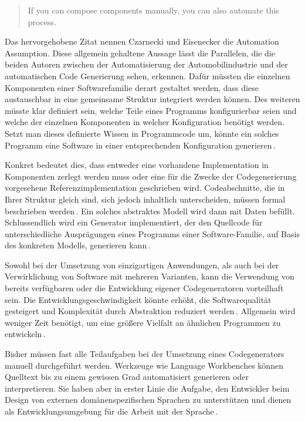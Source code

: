 \documentclass[12pt,oneside,a4paper,parskip]{scrbook}
\begin{document}
\begin{quote}
	\glqq If you can compose components manually, you can also automate this process.\grqq
\end{quote}

Das hervorgehobene Zitat nennen Czarnecki und Eisenecker die Automation Assumption. Diese allgemein gehaltene Aussage lässt die Parallelen, die die beiden Autoren zwischen der Automatisierung der Automobilindustrie und der automatischen Code Generierung sehen, erkennen. Dafür müssten die einzelnen Komponenten einer Softwarefamilie derart gestaltet werden, dass diese austauschbar in eine gemeinsame Struktur integriert werden können. Des weiteren müsste klar definiert sein, welche Teile eines Programms konfigurierbar seien und welche der einzelnen Komponenten in welcher Konfiguration benötigt werden. Setzt man dieses definierte Wissen in Programmcode um, könnte ein solches Programm eine Software in einer entsprechenden Konfiguration generieren\,\cite{czaeis2000}.

Konkret bedeutet dies, dass entweder eine vorhandene Implementation in Komponenten zerlegt werden muss oder eine für die Zwecke der Codegenerierung vorgesehene Referenzimplementation geschrieben wird. Codeabschnitte, die in Ihrer Struktur gleich sind, sich jedoch inhaltlich unterscheiden, müssen formal beschrieben werden\,\cite{stahl2007}. Ein solches abstraktes Modell wird dann mit Daten befüllt. Schlussendlich wird ein Generator implementiert, der den Quellcode für unterschiedliche Ausprägungen eines Programms einer Software-Familie, auf Basis des konkreten Modells, generieren kann\,\cite{fowler2010}.

Sowohl bei der Umsetzung von einzigartigen Anwendungen, als auch bei der Verwirklichung von Software mit mehreren Varianten, kann die Verwendung von bereits verfügbaren oder die Entwicklung eigener Codegeneratoren vorteilhaft sein. Die Entwicklungsgeschwindigkeit könnte erhöht, die Softwarequalität gesteigert und Komplexität durch Abstraktion reduziert werden\,\cite{stahl2007}. Allgemein wird weniger Zeit benötigt, um eine größere Vielfalt an ähnlichen Programmen zu entwickeln\,\cite{czaeis2000}.

Bisher müssen fast alle Teilaufgaben bei der Umsetzung eines Codegenerators manuell durchgeführt werden. Werkzeuge wie Language Workbenches können Quelltext bis zu einem gewissen Grad automatisiert generieren oder interpretieren. Sie haben aber in erster Linie die Aufgabe, den Entwickler beim Design von externen domänenspezifischen Sprachen zu unterstützen und dienen als Entwicklungsumgebung für die Arbeit mit der Sprache\,\cite{fowler2010}.
\end{document}
